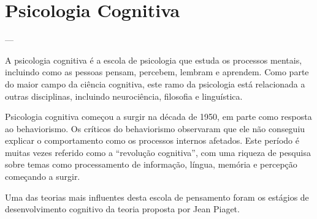 \section{Psicologia Cognitiva}\label{cognitivismo}


---

A psicologia cognitiva é a escola de psicologia que estuda os processos mentais, incluindo como as pessoas pensam, percebem, lembram e aprendem. Como parte do maior campo da ciência cognitiva, este ramo da psicologia está relacionada a outras disciplinas, incluindo neurociência, filosofia e linguística.

Psicologia cognitiva começou a surgir na década de 1950, em parte como resposta ao behaviorismo. Os críticos do behaviorismo observaram que ele não conseguiu explicar o comportamento como os processos internos afetados. Este período é muitas vezes referido como a “revolução cognitiva”, com uma riqueza de pesquisa sobre temas como processamento de informação, língua, memória e percepção começando a surgir.

Uma das teorias mais influentes desta escola de pensamento foram os estágios de desenvolvimento cognitivo da teoria proposta por Jean Piaget.